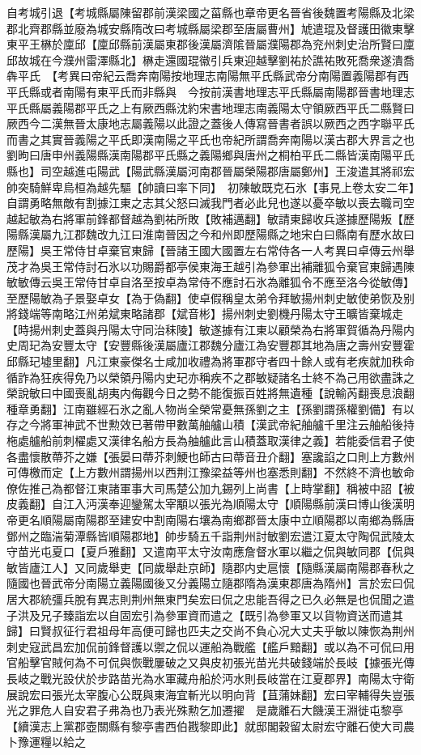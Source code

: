 自考城引退【考城縣屬陳留郡前漢梁國之菑縣也章帝更名晉省後魏置考陽縣及北梁郡北齊郡縣並廢為城安縣隋改曰考城縣屬梁郡至唐屬曹州】虓遣琨及督護田徽東擊東平王楙於廩邱【廩邱縣前漢屬東郡後漢屬濟隂晉屬濮陽郡為兖州刺史治所賢曰廩邱故城在今濮州雷澤縣北】楙走還國琨徽引兵東迎越擊劉祐於譙祐敗死喬衆遂潰喬犇平氏　【考異曰帝紀云喬奔南陽按地理志南陽無平氏縣武帝分南陽置義陽郡有西平氏縣或者南陽有東平氏而非縣與　今按前漢書地理志平氏縣屬南陽郡晉書地理志平氏縣屬義陽郡平氏之上有厥西縣沈約宋書地理志南義陽太守領厥西平氏二縣賢曰厥西今二漢無晉太康地志屬義陽以此證之蓋後人傳寫晉書者誤以厥西之西字聯平氏而書之其實晉義陽之平氏即漢南陽之平氏也帝紀所謂喬奔南陽以漢古郡大界言之也劉昫曰唐申州義陽縣漢南陽郡平氏縣之義陽鄉與唐州之桐柏平氏二縣皆漢南陽平氏縣也】司空越進屯陽武【陽武縣漢屬河南郡晉屬榮陽郡唐屬鄭州】王浚遣其將祁宏帥突騎鮮卑烏桓為越先驅【帥讀曰率下同】　初陳敏既克石氷【事見上卷太安二年】自謂勇略無敵有割據江東之志其父怒曰滅我門者必此兒也遂以憂卒敏以喪去職司空越起敏為右將軍前鋒都督越為劉祐所敗【敗補邁翻】敏請東歸收兵遂據歷陽叛【歷陽縣漢屬九江郡魏改九江曰淮南晉因之今和州即歷陽縣之地宋白曰縣南有歷水故曰歷陽】吳王常侍甘卓棄官東歸【晉諸王國大國置左右常侍各一人考異曰卓傳云州舉茂才為吳王常侍討石氷以功賜爵都亭侯東海王越引為參軍出補離狐令棄官東歸遇陳敏敏傳云吳王常侍甘卓自洛至按卓為常侍不應討石氷為離狐令不應至洛今從敏傳】至歷陽敏為子景娶卓女【為于偽翻】使卓假稱皇太弟令拜敏揚州刺史敏使弟恢及别將錢端等南略江州弟斌東略諸郡【斌音彬】揚州刺史劉機丹陽太守王曠皆棄城走【時揚州刺史蓋與丹陽太守同治秣陵】敏遂據有江東以顧榮為右將軍賀循為丹陽内史周玘為安豐太守【安豐縣後漢屬廬江郡魏分廬江為安豐郡其地為唐之壽州安豐霍邱縣玘墟里翻】凡江東豪傑名士咸加收禮為將軍郡守者四十餘人或有老疾就加秩命循詐為狂疾得免乃以榮領丹陽内史玘亦稱疾不之郡敏疑諸名士終不為己用欲盡誅之榮說敏曰中國喪亂胡夷内侮觀今日之勢不能復振百姓將無遺種【說輸芮翻喪息浪翻種章勇翻】江南雖經石氷之亂人物尚全榮常憂無孫劉之主【孫劉謂孫權劉備】有以存之今將軍神武不世勲效已著帶甲數萬舳艫山積【漢武帝紀舳艫千里注云舳船後持柂處艫船前刺櫂處又漢律名船方長為舳艫此言山積蓋取漢律之義】若能委信君子使各盡懷散蔕芥之嫌【張晏曰蔕芥刺鯁也師古曰蔕音丑介翻】塞讒諂之口則上方數州可傳檄而定【上方數州謂揚州以西荆江豫梁益等州也塞悉則翻】不然終不濟也敏命僚佐推己為都督江東諸軍事大司馬楚公加九錫列上尚書【上時掌翻】稱被中詔【被皮義翻】自江入沔漢奉迎鑾駕太宰顒以張光為順陽太守【順陽縣前漢曰博山後漢明帝更名順陽屬南陽郡至建安中割南陽右壤為南鄉郡晉太康中立順陽郡以南鄉為縣唐鄧州之臨湍菊潭縣皆順陽郡地】帥步騎五千詣荆州討敏劉宏遣江夏太守陶侃武陵太守苗光屯夏口【夏戶雅翻】又遣南平太守汝南應詹督水軍以繼之侃與敏同郡【侃與敏皆廬江人】又同歲舉吏【同歲舉赴京師】隨郡内史扈懷【隨縣漢屬南陽郡春秋之隨國也晉武帝分南陽立義陽國後又分義陽立隨郡隋為漢東郡唐為隋州】言於宏曰侃居大郡統彊兵脫有異志則荆州無東門矣宏曰侃之忠能吾得之已久必無是也侃聞之遣子洪及兄子臻詣宏以自固宏引為參軍資而遣之【既引為參軍又以貨物資送而遣其歸】曰賢叔征行君祖母年高便可歸也匹夫之交尚不負心况大丈夫乎敏以陳恢為荆州刺史寇武昌宏加侃前鋒督護以禦之侃以運船為戰艦【艦戶黯翻】或以為不可侃曰用官船擊官賊何為不可侃與恢戰屢破之又與皮初張光苗光共破錢端於長岐【據張光傳長岐之戰光設伏於步路苗光為水軍藏舟船於沔水則長岐當在江夏郡界】南陽太守衛展說宏曰張光太宰腹心公既與東海宜斬光以明向背【苴蒲妹翻】宏曰宰輔得失豈張光之罪危人自安君子弗為也乃表光殊勲乞加遷擢　是歲離石大饑漢王淵徙屯黎亭【續漢志上黨郡壺關縣有黎亭書西伯戡黎即此】就邸閣穀留太尉宏守離石使大司農卜豫運糧以給之

